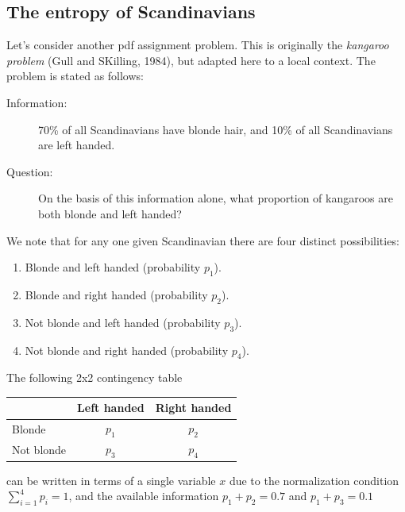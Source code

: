 \documentclass[%
oneside,                 %
final,                   %
10pt]{article}
\begin{document}
\subsection{The entropy of Scandinavians}

Let's consider another pdf assignment problem. This is originally the \emph{kangaroo problem} (Gull and SKilling, 1984), but adapted here to a local context. The problem is stated as follows:

\begin{description}
\item[Information:] 
  70\% of all Scandinavians have blonde hair, and 10\% of all Scandinavians are left handed.

\item[Question:] 
  On the basis of this information alone, what proportion of kangaroos are both blonde and left handed?
\end{description}

\noindent
We note that for any one given Scandinavian there are four distinct possibilities: 
\begin{enumerate}
\item Blonde and left handed (probability $p_1$).

\item Blonde and right handed (probability $p_2$).

\item Not blonde and left handed (probability $p_3$).

\item Not blonde and right handed (probability $p_4$).
\end{enumerate}

\noindent
The following 2x2 contingency table



\begin{tabular}{lcc}
\hline
\multicolumn{1}{c}{  } & \multicolumn{1}{c}{ Left handed } & \multicolumn{1}{c}{ Right handed } \\
\hline
Blonde     & $p_1$       & $p_2$        \\
Not blonde & $p_3$       & $p_4$        \\
\hline
\end{tabular}


\noindent
can be written in terms of a single variable $x$ due to the normalization condition $\sum_{i=1}^4 p_i = 1$, and the available information $p_1 + p_2 = 0.7$ and $p_1 + p_3 = 0.1$
\end{document}
